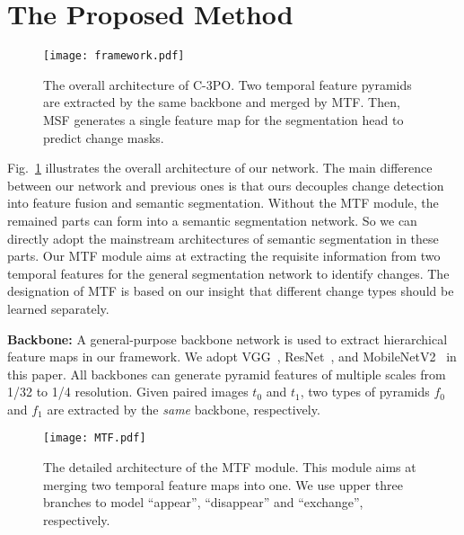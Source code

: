 \documentclass[review]{elsarticle}
\begin{document}
\section{The Proposed Method}

\begin{figure}
	\centering
	\texttt{[image: framework.pdf]}
	\caption{The overall architecture of C-3PO. Two temporal feature pyramids are extracted by the same backbone and merged by MTF. Then, MSF generates a single feature map for the segmentation head to predict change masks.}
	\label{fig:framework}
\end{figure}

Fig.~\ref{fig:framework} illustrates the overall architecture of our network. The main difference between our network and previous ones is that ours decouples change detection into feature fusion and semantic segmentation. Without the MTF module, the remained parts can form into a semantic segmentation network. So we can directly adopt the mainstream architectures of semantic segmentation in these parts. Our MTF module aims at extracting the requisite information from two temporal features for the general segmentation network to identify changes. The designation of MTF is based on our insight that different change types should be learned separately.

\textbf{Backbone:} A general-purpose backbone network is used to extract hierarchical feature maps in our framework. We adopt VGG~\cite{VGG}, ResNet~\cite{ResNet}, and MobileNetV2~\cite{mobilenet} in this paper. All backbones can generate pyramid features of multiple scales from 1/32 to 1/4 resolution. Given paired images $t_0$ and $t_1$, two types of pyramids $f_0$ and $f_1$ are extracted by the \emph{same} backbone, respectively. 

\begin{figure}
	\centering
	\texttt{[image: MTF.pdf]}
	\caption{The detailed architecture of the MTF module. This module aims at merging two temporal feature maps into one. We use upper three branches to model ``appear'', ``disappear'' and ``exchange'', respectively.}
	\label{fig:MTF}
\end{figure}
\end{document}
